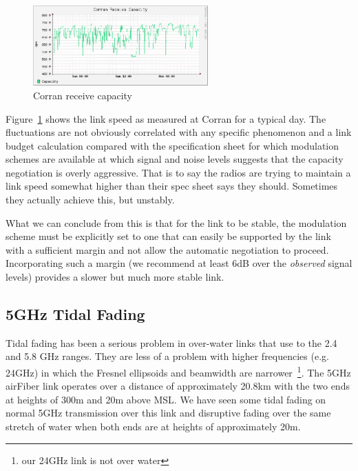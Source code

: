 \documentclass{amsart}
\begin{document}
\begin{figure}
\includegraphics[width=0.6\textwidth]{corran-rcvcap}
\caption{Corran receive capacity}
\label{fig:corran-rcvcap}
\end{figure}
Figure~\ref{fig:corran-rcvcap} shows the link speed as measured at
Corran for a typical day. The fluctuations are not obviously
correlated with any specific phenomenon and a link budget calculation
compared with the specification sheet for which
modulation schemes are available at which signal and noise levels
suggests that the capacity negotiation is overly aggressive. That is
to say the radios are trying to maintain a link speed somewhat higher
than their spec sheet says they should. Sometimes they actually
achieve this, but unstably.

What we can conclude from this is that for the link to be stable, the
modulation scheme must be explicitly set to one that can easily be
supported by the link with a sufficient margin and not allow the
automatic negotiation to proceed. Incorporating such a margin (we
recommend at least 6dB over the \emph{observed} signal levels)
provides a slower but much more stable link.

\subsection{5GHz Tidal Fading}
Tidal fading has been a serious problem in over-water links that 
use to the 2.4 and 5.8 GHz ranges.  They are less of a problem with
higher frequencies (e.g. 24GHz) in which the Fresnel ellipsoids and
beamwidth are narrower~\footnote{our 24GHz link is not over
  water}. The 5GHz airFiber link operates over a distance of
approximately  20.8km with the two ends at heights of 300m and 20m
above MSL.  We have seen some tidal fading on normal 5GHz transmission
over this link and disruptive fading over the same stretch of water
when both ends are at heights of approximately 20m.
\end{document}
